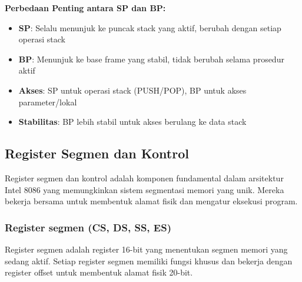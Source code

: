 \documentclass[../main.tex]{subfiles}
\begin{document}

\textbf{Perbedaan Penting antara SP dan BP:}
\begin{itemize}
    \item \textbf{SP}: Selalu menunjuk ke puncak stack yang aktif, berubah dengan setiap operasi stack
    \item \textbf{BP}: Menunjuk ke base frame yang stabil, tidak berubah selama prosedur aktif
    \item \textbf{Akses}: SP untuk operasi stack (PUSH/POP), BP untuk akses parameter/lokal
    \item \textbf{Stabilitas}: BP lebih stabil untuk akses berulang ke data stack
\end{itemize}

        \subsection{Register Segmen dan Kontrol}\label{subsec:arsitektur-segmen-kontrol}
            Register segmen dan kontrol adalah komponen fundamental dalam arsitektur Intel 8086 yang memungkinkan sistem segmentasi memori yang unik. Mereka bekerja bersama untuk membentuk alamat fisik dan mengatur eksekusi program.

            \subsubsection{Register segmen (CS, DS, SS, ES)}
Register segmen adalah register 16-bit yang menentukan segmen memori yang sedang aktif. Setiap register segmen memiliki fungsi khusus dan bekerja dengan register offset untuk membentuk alamat fisik 20-bit.
\end{document}
